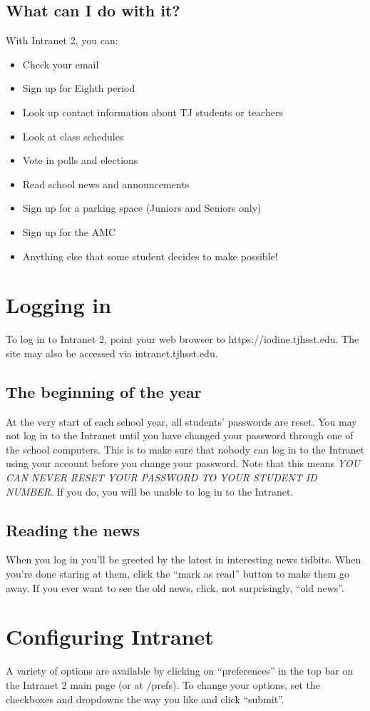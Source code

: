 \documentclass[11pt,letterpaper]{report}
\begin{document}
\subsection{What can I do with it?}
With Intranet 2, you can:
\begin{itemize}
\item Check your email
\item Sign up for Eighth period
\item Look up contact information about TJ students or teachers
\item Look at class schedules
\item Vote in polls and elections
\item Read school news and announcements
\item Sign up for a parking space (Juniors and Seniors only)
\item Sign up for the AMC
\item Anything else that some student decides to make possible!
\end{itemize}
\section{Logging in}
To log in to Intranet 2, point your web browser to https://iodine.tjhsst.edu.  
The site may also be accessed via intranet.tjhsst.edu.
\subsection{The beginning of the year}
At the very start of each school year, all students' passwords are reset.
You may not log in to the Intranet until you have changed your password through one of the school computers.
This is to make sure that nobody can log in to the Intranet using your account before you change your password.
Note that this means \emph{YOU CAN NEVER RESET YOUR PASSWORD TO YOUR STUDENT ID NUMBER}. If you do, you will be
unable to log in to the Intranet.
\subsection{Reading the news}
When you log in you'll be greeted by the latest in interesting news tidbits.  When you're done staring at them,
click the ``mark as read'' button to make them go away.  If you ever want to see the old news, click, not surprisingly,
``old news''.
\section{Configuring Intranet}
A variety of options are available by clicking on ``preferences'' in the top bar on the 
Intranet 2 main page (or at /prefs).  To change your options, set the checkboxes and
dropdowns the way you like and click ``submit''.  
\end{document}
